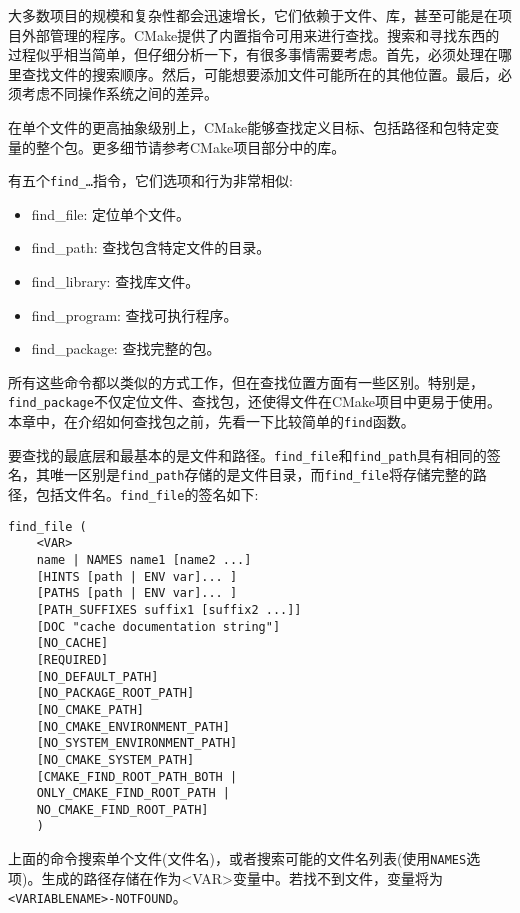
大多数项目的规模和复杂性都会迅速增长，它们依赖于文件、库，甚至可能是在项目外部管理的程序。CMake提供了内置指令可用来进行查找。搜索和寻找东西的过程似乎相当简单，但仔细分析一下，有很多事情需要考虑。首先，必须处理在哪里查找文件的搜索顺序。然后，可能想要添加文件可能所在的其他位置。最后，必须考虑不同操作系统之间的差异。

在单个文件的更高抽象级别上，CMake能够查找定义目标、包括路径和包特定变量的整个包。更多细节请参考CMake项目部分中的库。

有五个\texttt{find\_…}指令，它们选项和行为非常相似:

\begin{itemize}
\item 
find\_file: 定位单个文件。

\item 
find\_path: 查找包含特定文件的目录。

\item 
find\_library: 查找库文件。

\item 
find\_program: 查找可执行程序。

\item 
find\_package: 查找完整的包。
\end{itemize}

所有这些命令都以类似的方式工作，但在查找位置方面有一些区别。特别是，\texttt{find\_package}不仅定位文件、查找包，还使得文件在CMake项目中更易于使用。本章中，在介绍如何查找包之前，先看一下比较简单的\texttt{find}函数。


要查找的最底层和最基本的是文件和路径。\texttt{find\_file}和\texttt{find\_path}具有相同的签名，其唯一区别是\texttt{find\_path}存储的是文件目录，而\texttt{find\_file}将存储完整的路径，包括文件名。\texttt{find\_file}的签名如下:

\begin{lstlisting}[style=styleCMake]
find_file (
	<VAR>
	name | NAMES name1 [name2 ...]
	[HINTS [path | ENV var]... ]
	[PATHS [path | ENV var]... ]
	[PATH_SUFFIXES suffix1 [suffix2 ...]]
	[DOC "cache documentation string"]
	[NO_CACHE]
	[REQUIRED]
	[NO_DEFAULT_PATH]
	[NO_PACKAGE_ROOT_PATH]
	[NO_CMAKE_PATH]
	[NO_CMAKE_ENVIRONMENT_PATH]
	[NO_SYSTEM_ENVIRONMENT_PATH]
	[NO_CMAKE_SYSTEM_PATH]
	[CMAKE_FIND_ROOT_PATH_BOTH |
	ONLY_CMAKE_FIND_ROOT_PATH |
	NO_CMAKE_FIND_ROOT_PATH]
	)
\end{lstlisting}

上面的命令搜索单个文件(文件名)，或者搜索可能的文件名列表(使用\texttt{NAMES}选项)。生成的路径存储在作为<VAR>变量中。若找不到文件，变量将为\texttt{<VARIABLENAME>-NOTFOUND}。

